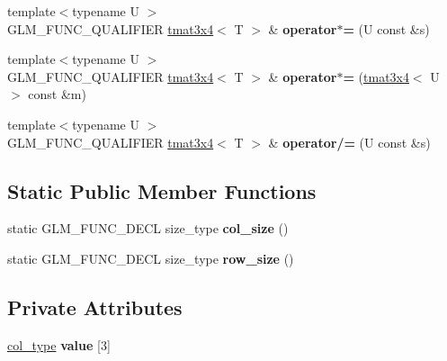 \begin{DoxyCompactItemize}
\item 
\hypertarget{structglm_1_1detail_1_1tmat3x4_aa0d4113930ab360d4f5575fa73003501}{}{\footnotesize template$<$typename U $>$ }\\G\+L\+M\+\_\+\+F\+U\+N\+C\+\_\+\+Q\+U\+A\+L\+I\+F\+I\+E\+R \hyperlink{structglm_1_1detail_1_1tmat3x4}{tmat3x4}$<$ T $>$ \& {\bfseries operator$\ast$=} (U const \&s)\label{structglm_1_1detail_1_1tmat3x4_aa0d4113930ab360d4f5575fa73003501}

\item 
\hypertarget{structglm_1_1detail_1_1tmat3x4_a7f656b8af39de92a031890d41512f795}{}{\footnotesize template$<$typename U $>$ }\\G\+L\+M\+\_\+\+F\+U\+N\+C\+\_\+\+Q\+U\+A\+L\+I\+F\+I\+E\+R \hyperlink{structglm_1_1detail_1_1tmat3x4}{tmat3x4}$<$ T $>$ \& {\bfseries operator$\ast$=} (\hyperlink{structglm_1_1detail_1_1tmat3x4}{tmat3x4}$<$ U $>$ const \&m)\label{structglm_1_1detail_1_1tmat3x4_a7f656b8af39de92a031890d41512f795}

\item 
\hypertarget{structglm_1_1detail_1_1tmat3x4_af4077f6b0bd7556d9d724341a300ad8a}{}{\footnotesize template$<$typename U $>$ }\\G\+L\+M\+\_\+\+F\+U\+N\+C\+\_\+\+Q\+U\+A\+L\+I\+F\+I\+E\+R \hyperlink{structglm_1_1detail_1_1tmat3x4}{tmat3x4}$<$ T $>$ \& {\bfseries operator/=} (U const \&s)\label{structglm_1_1detail_1_1tmat3x4_af4077f6b0bd7556d9d724341a300ad8a}

\end{DoxyCompactItemize}
\subsection*{Static Public Member Functions}
\begin{DoxyCompactItemize}
\item 
\hypertarget{structglm_1_1detail_1_1tmat3x4_a9c3d97c02718f4e9a45cabe4e2ef1fe9}{}static G\+L\+M\+\_\+\+F\+U\+N\+C\+\_\+\+D\+E\+C\+L size\+\_\+type {\bfseries col\+\_\+size} ()\label{structglm_1_1detail_1_1tmat3x4_a9c3d97c02718f4e9a45cabe4e2ef1fe9}

\item 
\hypertarget{structglm_1_1detail_1_1tmat3x4_a36158f36742dc0754be50ef176491759}{}static G\+L\+M\+\_\+\+F\+U\+N\+C\+\_\+\+D\+E\+C\+L size\+\_\+type {\bfseries row\+\_\+size} ()\label{structglm_1_1detail_1_1tmat3x4_a36158f36742dc0754be50ef176491759}

\end{DoxyCompactItemize}
\subsection*{Private Attributes}
\begin{DoxyCompactItemize}
\item 
\hypertarget{structglm_1_1detail_1_1tmat3x4_abcf38ca61a64bce66025e8b43b645301}{}\hyperlink{structglm_1_1detail_1_1tvec4}{col\+\_\+type} {\bfseries value} \mbox{[}3\mbox{]}\label{structglm_1_1detail_1_1tmat3x4_abcf38ca61a64bce66025e8b43b645301}

\end{DoxyCompactItemize}


